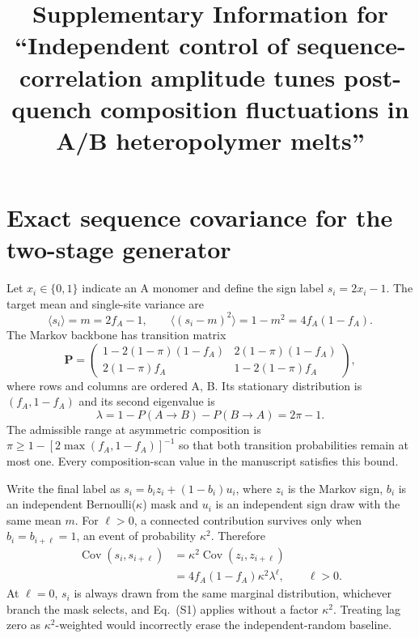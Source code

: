 \documentclass[pdflatex,sn-nature,onecolumn]{sn-jnl}
\title{Supplementary Information for ``Independent control of sequence-correlation amplitude tunes post-quench composition fluctuations in A/B heteropolymer melts''}
\author*{\fnm{Alexander Okezue} \sur{Bell}}\email{okezue@stanford.edu}
\affil{\orgname{Stanford University}, \orgaddress{\street{450 Jane Stanford Way}, \city{Stanford}, \state{CA}, \postcode{94305}, \country{USA}}}
\begin{document}
\maketitle
\raggedright
\raggedbottom
\pagestyle{plain}
\thispagestyle{plain}
\linenumbers
\renewcommand\linenumberfont{\normalfont\tiny\sffamily\color{gray}}
\renewcommand{\thefigure}{S\arabic{figure}}
\renewcommand{\tablename}{Supplementary Table}
\renewcommand{\thetable}{S\arabic{table}}

\section*{Exact sequence covariance for the two-stage generator}

Let $x_i\in\{0,1\}$ indicate an A monomer and define the sign label $s_i=2x_i-1$. The target mean and single-site variance are
\begin{equation}
\langle s_i\rangle=m=2f_A-1,\qquad
\langle(s_i-m)^2\rangle=1-m^2=4f_A(1-f_A).
\tag{S1}
\end{equation}
The Markov backbone has transition matrix
\begin{equation}
\bm{P}=\begin{pmatrix}
1-2(1-\pi)(1-f_A) & 2(1-\pi)(1-f_A)\\
2(1-\pi)f_A & 1-2(1-\pi)f_A
\end{pmatrix},
\tag{S2}
\end{equation}
where rows and columns are ordered A, B. Its stationary distribution is $(f_A,1-f_A)$ and its second eigenvalue is
\begin{equation}
\lambda=1-P(A\rightarrow B)-P(B\rightarrow A)=2\pi-1.
\tag{S3}
\end{equation}
The admissible range at asymmetric composition is $\pi\ge 1-[2\max(f_A,1-f_A)]^{-1}$ so that both transition probabilities remain at most one. Every composition-scan value in the manuscript satisfies this bound.

Write the final label as $s_i=b_i z_i+(1-b_i)u_i$, where $z_i$ is the Markov sign, $b_i$ is an independent Bernoulli($\kappa$) mask and $u_i$ is an independent sign draw with the same mean $m$. For $\ell>0$, a connected contribution survives only when $b_i=b_{i+\ell}=1$, an event of probability $\kappa^2$. Therefore
\begin{align}
\operatorname{Cov}(s_i,s_{i+\ell})
&=\kappa^2\operatorname{Cov}(z_i,z_{i+\ell})\nonumber\\
&=4f_A(1-f_A)\kappa^2\lambda^\ell,\qquad \ell>0.
\tag{S4}
\end{align}
At $\ell=0$, $s_i$ is always drawn from the same marginal distribution, whichever branch the mask selects, and Eq.~(S1) applies without a factor $\kappa^2$. Treating lag zero as $\kappa^2$-weighted would incorrectly erase the independent-random baseline.
\end{document}
